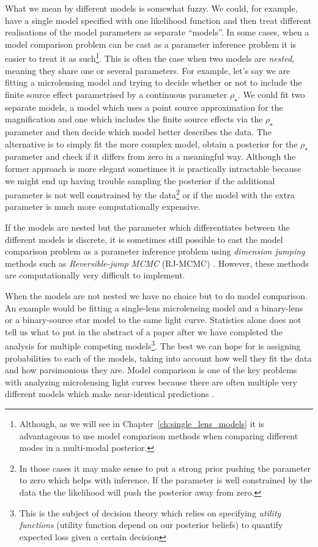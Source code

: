 \documentclass[12pt,dvipsnames]{report}
\begin{document}
What we mean by different models is somewhat fuzzy. We could, for example, have 
a single model specified with one likelihood function 
and then treat different realisations of the model parameters as separate  ``models''. 
In some cases, when a model comparison problem can be cast as a parameter inference problem it 
is easier to treat it as such\footnote{Although, as we
will see in Chapter~\ref{ch:single_lens_models} it is advantageous  to use model 
comparison methods when comparing different modes in a multi-modal posterior.}.
This is often the case when two models are \emph{nested}, meaning they share one or 
several parameters.
For example, let's say we are fitting a microlensing model and trying to decide 
whether  or not to include the finite source effect parametrised by a continuous 
parameter $\rho_\star$.
We could fit two separate models, a model which uses a point source 
approximation for the magnification and one which includes the finite source 
effects via the $\rho_\star$ parameter and then decide which model better 
describes the data. The alternative is to simply fit the more complex model, 
obtain a posterior for the $\rho_\star$ parameter and check if it differs from 
zero in a meaningful way. Although the former approach is more elegant sometimes
it is practically intractable because we might end up having trouble sampling 
the posterior if the additional parameter is not well constrained by the data\footnote{In those
cases it may make sense to put a strong prior pushing the parameter to zero which 
helps with inference. If the parameter is well constrained by the data the 
the likelihood will push the posterior away from zero.} or if the model with the 
extra parameter is much more computationally expensive. 

If the models are nested but the parameter which differentiates between the different 
models is discrete, it is sometimes still possible to cast the model comparison problem 
as a parameter inference problem using \emph{dimension jumping} methods such as 
\emph{Reversible-jump MCMC} (RJ-MCMC)
\citep[See][for an application of a method similar to RJ-MCMC to an 
astronomy problem]{2015MNRAS.448.3206B}.
However, these methods are computationally very difficult to implement.

When the models are not nested we have no choice but to do model comparison. 
An example would be fitting a single-lens microlensing model and a binary-lens 
or a binary-source star model to the same light curve. 
Statistics alone does not tell us what to put in the 
abstract of a paper after we have completed the analysis for multiple competing 
models\footnote{This is the subject of decision theory which relies on 
specifying \emph{utility functions} (utility function depend on our posterior beliefs) 
to quantify expected loss given a certain decision}. The best we can hope for is 
assigning probabilities to each of the models, taking into account how well they 
fit the data and how parsimonious they are. Model 
comparison is one of the key problems with analyzing microlensing light curves 
because there are often multiple very different models which make near-identical 
predictions  
\citep[see][for examples from microlensing]{ 2017AJ....153..129J,2020AJ....160...17H,2021AJ....162...59R}.
\end{document}
